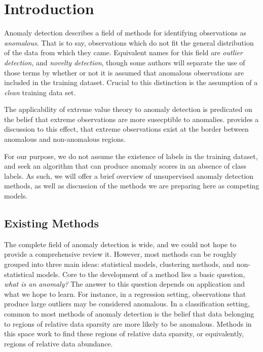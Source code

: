 \section{Introduction}

Anomaly detection describes a field of methods for identifying observations as \emph{anomalous}.  That
  is to say, observations which do not fit the general distribution of the data from which they came.
  Equivalent names for this field are \emph{outlier detection}, and \emph{novelty detection}, though
  some authors will separate the use of those terms by whether or not it is assumed that anomalous
  observations are included in the training dataset.  Crucial to this distinction is the assumption
  of a \emph{clean} training data set.

The applicability of extreme value theory to anomaly detection is predicated on the belief that
  extreme observations are more susecptible to anomalies.  \cite{goix2017} provides a discussion to
  this effect, that extreme observations exist at the border between anomalous and non-anomalous regions.

For our purpose, we do not assume the existence of labels in the training dataset, and seek an
  algorithm that can produce anomaly scores in an absence of class labels. As such, we will offer
  a brief overview of unsupervised anomaly detection methods, as well as discussion of the methods
  we are preparing here as competing models.


\subsection{Existing Methods}
The complete field of anomaly detection is wide, and we could not hope to provide a comprehensive review
    it.  However, most methods can be roughly grouped into three main ideas: statistical models, clustering
    methods, and non-statistical models. Core to the development of a method lies a basic question,
    \emph{what is an anomaly?}  The answer to this question depends on application and what we hope to
    learn.  For instance, in a regression setting, observations that produce large outliers may be considered
    anomalous.  In a classification setting, common to most methods of anomaly detection is the belief
    that data belonging to regions of relative data sparsity are more likely to be anomalous.  Methods in
    this space work to find these regions of relative data sparsity, or equivalently, regions of relative
    data abundance.

